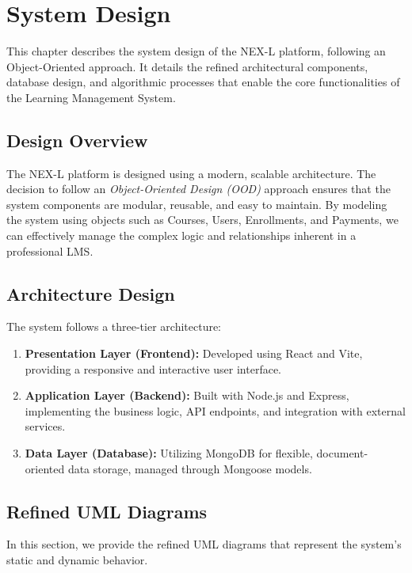 \chapter{System Design}
\label{ch:system_design}

This chapter describes the system design of the NEX-L platform, following an Object-Oriented approach. It details the refined architectural components, database design, and algorithmic processes that enable the core functionalities of the Learning Management System.

\section{Design Overview}
The NEX-L platform is designed using a modern, scalable architecture. The decision to follow an \textit{Object-Oriented Design (OOD)} approach ensures that the system components are modular, reusable, and easy to maintain. By modeling the system using objects such as Courses, Users, Enrollments, and Payments, we can effectively manage the complex logic and relationships inherent in a professional LMS.

\section{Architecture Design}
The system follows a three-tier architecture:
\begin{enumerate}
    \item \textbf{Presentation Layer (Frontend):} Developed using React and Vite, providing a responsive and interactive user interface.
    \item \textbf{Application Layer (Backend):} Built with Node.js and Express, implementing the business logic, API endpoints, and integration with external services.
    \item \textbf{Data Layer (Database):} Utilizing MongoDB for flexible, document-oriented data storage, managed through Mongoose models.
\end{enumerate}

\section{Refined UML Diagrams}
In this section, we provide the refined UML diagrams that represent the system's static and dynamic behavior.

